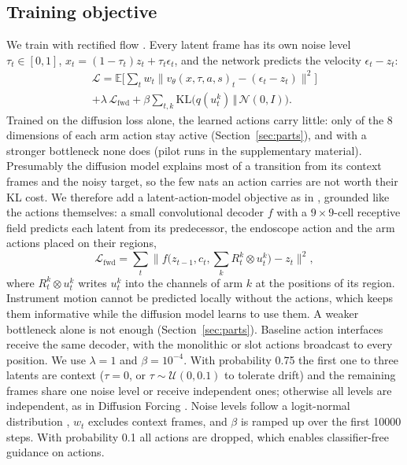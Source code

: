 \subsection{Training objective}
We train with rectified flow \cite{rectflow,flowmatching}. Every latent frame has its own noise level $\tau_t\in[0,1]$, $x_t=(1-\tau_t)z_t+\tau_t\epsilon_t$, and the network predicts the velocity $\epsilon_t-z_t$:
\begin{multline}
\mathcal{L}=\mathbb{E}\Big[\sum_{t}w_t\big\lVert v_\theta(x,\tau,a,s)_t-(\epsilon_t-z_t)\big\rVert^2\Big]\\
+\lambda\,\mathcal{L}_{\mathrm{fwd}}+\beta\sum_{t,k}\mathrm{KL}\big(q(u^k_t)\,\Vert\,\mathcal{N}(0,I)\big).
\end{multline}
Trained on the diffusion loss alone, the learned actions carry little: only  of the 8 dimensions of each arm action stay active (Section~\ref{sec:parts}), and with a stronger bottleneck none does (pilot runs in the supplementary material). Presumably the diffusion model explains most of a transition from its context frames and the noisy target, so the few nats an action carries are not worth their KL cost. We therefore add a latent-action-model objective as in \cite{genie,lapa,adaworld}, grounded like the actions themselves: a small convolutional decoder $f$ with a $9\times9$-cell receptive field predicts each latent from its predecessor, the endoscope action and the arm actions placed on their regions,
\begin{equation}
\mathcal{L}_{\mathrm{fwd}}=\sum_t\big\lVert f\big(z_{t-1},c_t,\textstyle\sum_k R^k_t\otimes u^k_t\big)-z_t\big\rVert^2,
\end{equation}
where $R^k_t\otimes u^k_t$ writes $u^k_t$ into the channels of arm $k$ at the positions of its region. Instrument motion cannot be predicted locally without the actions, which keeps them informative while the diffusion model learns to use them. A weaker bottleneck alone is not enough (Section~\ref{sec:parts}). Baseline action interfaces receive the same decoder, with the monolithic or slot actions broadcast to every position. We use $\lambda=1$ and $\beta=10^{-4}$.
With probability 0.75 the first one to three latents are context ($\tau=0$, or $\tau\sim\mathcal{U}(0,0.1)$ to tolerate drift) and the remaining frames share one noise level or receive independent ones; otherwise all levels are independent, as in Diffusion Forcing \cite{dforcing}. Noise levels follow a logit-normal distribution \cite{sd3}, $w_t$ excludes context frames, and $\beta$ is ramped up over the first \num{10000} steps. With probability 0.1 all actions are dropped, which enables classifier-free guidance on actions.

